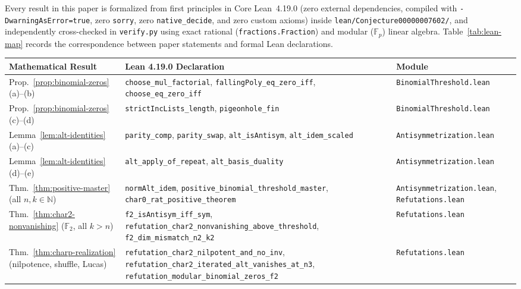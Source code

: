 \documentclass[11pt,a4paper]{article}
\theoremstyle{definition}
\theoremstyle{remark}
\newcommand{\F}{\mathbb{F}}
\newcommand{\N}{\mathbb{N}}
\begin{document}
Every result in this paper is formalized from first principles in Core Lean~4.19.0 (zero external dependencies, compiled with \texttt{-DwarningAsError=true}, zero \texttt{sorry}, zero \texttt{native\_decide}, and zero custom axioms) inside \texttt{lean/Conjecture00000007602/}, and independently cross-checked in \texttt{verify.py} using exact rational (\texttt{fractions.Fraction}) and modular ($\F_p$) linear algebra. Table~\ref{tab:lean-map} records the correspondence between paper statements and formal Lean declarations.

\begin{table}[ht]
\centering
\scriptsize
\renewcommand{\arraystretch}{1.32}
\begin{tabular}{@{}>{\raggedright\arraybackslash}p{}>{\raggedright\arraybackslash}p{}>{\raggedright\arraybackslash}p{}@{}}
\hline
\textbf{Mathematical Result} & \textbf{Lean 4.19.0 Declaration} & \textbf{Module} \\
\hline
Prop.~\ref{prop:binomial-zeros}(a)--(b) & \texttt{choose\_mul\_factorial}, \texttt{fallingPoly\_eq\_zero\_iff}, \texttt{choose\_eq\_zero\_iff} & \texttt{BinomialThreshold.lean} \\
Prop.~\ref{prop:binomial-zeros}(c)--(d) & \texttt{strictIncLists\_length}, \texttt{pigeonhole\_fin} & \texttt{BinomialThreshold.lean} \\
Lemma~\ref{lem:alt-identities}(a)--(c) & \texttt{parity\_comp}, \texttt{parity\_swap}, \texttt{alt\_isAntisym}, \texttt{alt\_idem\_scaled} & \texttt{Antisymmetrization.lean} \\
Lemma~\ref{lem:alt-identities}(d)--(e) & \texttt{alt\_apply\_of\_repeat}, \texttt{alt\_basis\_duality} & \texttt{Antisymmetrization.lean} \\
Thm.~\ref{thm:positive-master} (all $n,k \in \N$) & \texttt{normAlt\_idem}, \texttt{positive\_\allowbreak binomial\_\allowbreak threshold\_\allowbreak master}, \texttt{char0\_rat\_positive\_theorem} & \texttt{Antisymmetrization.lean}, \texttt{Refutations.lean} \\
Thm.~\ref{thm:char2-nonvanishing} ($\F_2$, all $k > n$) & \texttt{f2\_isAntisym\_iff\_sym}, \texttt{refutation\_\allowbreak char2\_\allowbreak nonvanishing\_\allowbreak above\_\allowbreak threshold}, \texttt{f2\_dim\_mismatch\_n2\_k2} & \texttt{Refutations.lean} \\
Thm.~\ref{thm:charp-realization} (nilpotence, shuffle, Lucas) & \texttt{refutation\_\allowbreak char2\_\allowbreak nilpotent\_\allowbreak and\_no\_inv}, \texttt{refutation\_\allowbreak char2\_\allowbreak iterated\_alt\_\allowbreak vanishes\_at\_n3}, \texttt{refutation\_\allowbreak modular\_\allowbreak binomial\_\allowbreak zeros\_f2} & \texttt{Refutations.lean} \\

\end{tabular}
\end{table}
\end{document}
